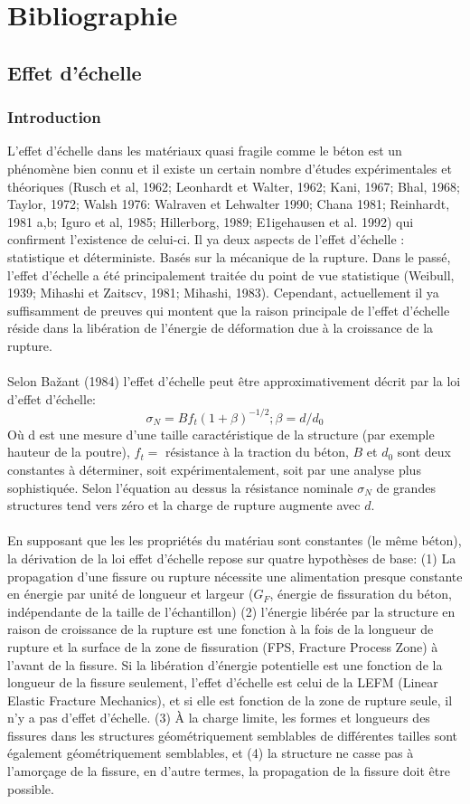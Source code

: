 \documentclass[12pt]{report}
\begin{document}
\part{Bibliographie}
\chapter{Effet d'échelle}
\section{Introduction}
L'effet d'échelle dans les matériaux quasi fragile comme le béton est un phénomène bien connu
et il existe un certain nombre d'études expérimentales et théoriques (Rusch et al, 1962; Leonhardt
et Walter, 1962; Kani, 1967; Bhal, 1968; Taylor, 1972; Walsh 1976: Walraven et Lehwalter
1990; Chana 1981; Reinhardt, 1981 a,b; Iguro et al, 1985; Hillerborg, 1989; E1igehausen et al.
1992) qui confirment l'existence de celui-ci. Il ya deux aspects de l'effet d'échelle : statistique et
déterministe. Basés sur la mécanique de la rupture. Dans le passé, l'effet d'échelle a été
principalement traitée du point de vue statistique (Weibull, 1939; Mihashi et Zaitscv, 1981;
Mihashi, 1983). Cependant, actuellement il ya suffisamment de preuves qui montent que la
raison principale de l'effet d'échelle réside dans la libération de l'énergie de déformation due à la
croissance de la rupture.\\\\
Selon Bažant (1984) l'effet d'échelle peut être approximativement décrit par la loi d'effet
d'échelle:\[\sigma_{N}=Bf_{t}(1+\beta)^{-1/2}  ; \beta=d/d_0\]
Où d est une mesure d'une taille caractéristique de la structure (par exemple hauteur de la
poutre), $f_t =$ résistance à la traction du béton, $B$ et $d_0$ sont deux constantes à déterminer, soit
expérimentalement, soit par une analyse plus sophistiquée. Selon l'équation au dessus la
résistance nominale $\sigma_N$ de grandes structures tend vers zéro et la charge de rupture augmente
avec $d$.\\\\
En supposant que les les propriétés du matériau sont constantes (le même béton), la
dérivation de la loi effet d'échelle repose sur quatre hypothèses de base: (1) La propagation d'une
fissure ou rupture nécessite une alimentation presque constante en énergie par unité de longueur
et largeur ($G_F$, énergie de fissuration du béton, indépendante de la taille de l'échantillon) (2)
l'énergie libérée par la structure en raison de croissance de la rupture est une fonction à la fois de
la longueur de rupture et la surface de la zone de fissuration (FPS, Fracture Process Zone) à
l'avant de la fissure. Si la libération d'énergie potentielle est une fonction de la longueur de la
fissure seulement, l'effet d'échelle est celui de la LEFM (Linear Elastic Fracture Mechanics), et
si elle est fonction de la zone de rupture seule, il n'y a pas d'effet d'échelle. (3) À la charge
limite, les formes et longueurs des fissures dans les structures géométriquement semblables de
différentes tailles sont également géométriquement semblables, et (4) la structure ne casse pas à
l'amorçage de la fissure, en d'autre termes, la propagation de la fissure doit être possible.
\end{document}
